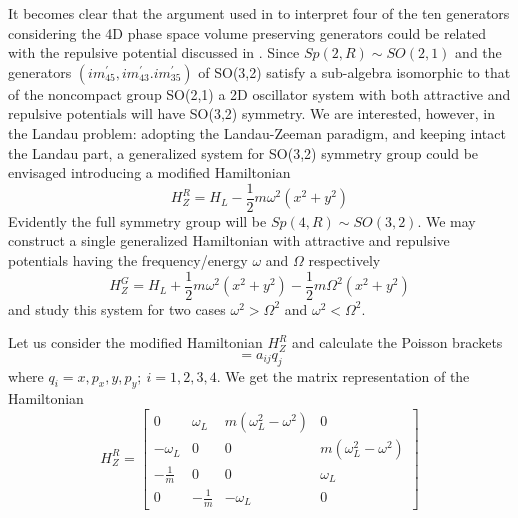 \documentclass[aps, singlecolumn, showpacs]{revtex4-2}
\begin{document}
It becomes clear that the argument used in \cite{17} to interpret four of the ten generators considering the 4D phase space volume preserving generators could be related with the repulsive potential discussed in \cite{18}. Since $Sp(2,R) \sim SO(2,1)$ and the generators $(i m^\prime_{45}, i m^\prime_{43}. i m^\prime_{35})$ of SO(3,2) satisfy a sub-algebra isomorphic to that of the noncompact group SO(2,1) a 2D oscillator system with both attractive and repulsive potentials will have SO(3,2) symmetry. We are interested, however, in the Landau problem: adopting the Landau-Zeeman paradigm, and keeping intact the Landau part, a generalized system for SO(3,2) symmetry group could be envisaged introducing a modified Hamiltonian
\begin{equation}
H_Z^R = H_L -\frac{1}{2} m \omega^2 (x^2 + y^2)
\end{equation}
Evidently the full symmetry group will be $Sp(4,R) \sim SO(3,2)$. We may construct a single generalized Hamiltonian with attractive and repulsive potentials having the frequency/energy $\omega$ and $\Omega$ respectively
\begin{equation}
H_Z^G = H_L +\frac{1}{2} m \omega^2 (x^2 + y^2)-\frac{1}{2} m \Omega^2 (x^2 + y^2)
\end{equation}
and study this system for two cases $\omega^2 >\Omega^2$ and  $\omega^2 <\Omega^2$.

Let us consider the modified Hamiltonian $H_Z^R$ and calculate the Poisson brackets
\begin{equation}
[H_Z^R,~ q_i]= a_{ij} q_j
\end{equation}
where $q_i =x,p_x,y,p_y; ~i=1,2,3,4$. We get the matrix representation of the Hamiltonian
\begin{equation} 
H_Z^R =\begin{bmatrix} 0 & \omega_L & m(\omega_L^2 -\omega^2) & 0 \\ -\omega_L & 0 & 0 & m(\omega_L^2 -\omega^2) \\ -\frac{1}{m} & 0 & 0 & \omega_L \\ 0 & -\frac{1}{m} &  -\omega_L & 0 \end{bmatrix}
\end{equation}
\end{document}
